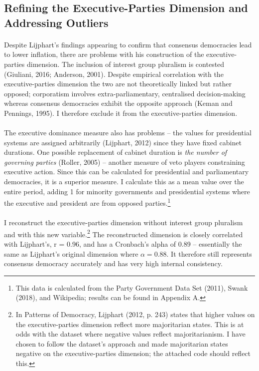 \documentclass[11pt, oneside]{article}   	%
\let\oldparagraph\paragraph
\renewcommand{\paragraph}[1]{\oldparagraph{#1}\mbox{}}
\begin{document}
\subsection{Refining the Executive-Parties Dimension and Addressing Outliers}

\paragraph{}
Despite Lijphart’s findings appearing to confirm that consensus democracies lead to lower inflation, there are problems with his construction of the executive-parties dimension. The inclusion of interest group pluralism is contested (Giuliani, 2016; Anderson, 2001). Despite empirical correlation with the executive-parties dimension the two are not theoretically linked but rather opposed; corporatism involves extra-parliamentary, centralised decision-making whereas consensus democracies exhibit the opposite approach (Keman and Pennings, 1995). I therefore exclude it from the executive-parties dimension.

\paragraph{}
The executive dominance measure also has problems – the values for presidential systems are assigned arbitrarily (Lijphart, 2012) since they have fixed cabinet durations. One possible replacement of cabinet duration is \textit{the number of governing parties} (Roller, 2005) – another measure of veto players constraining executive action. Since this can be calculated for presidential and parliamentary democracies, it is a superior measure. I calculate this as a mean value over the entire period, adding 1 for minority governments and presidential systems where the executive and president are from opposed parties.\footnote{  This data is calculated from the Party Government Data Set (2011), Swank (2018), and Wikipedia; results can be found in Appendix A.}

\paragraph{}
I reconstruct the executive-parties dimension without interest group pluralism and with this new variable.\footnote{  In Patterns of Democracy, Lijphart (2012, p. 243) states that higher values on the executive-parties dimension reflect more majoritarian states. This is at odds with the dataset where negative values reflect majoritarianism. I have chosen to follow the dataset’s approach and made majoritarian states negative on the executive-parties dimension; the attached code should reflect this.} The reconstructed dimension is closely correlated with Lijphart’s, r = 0.96, and has a Cronbach’s alpha of 0.89 – essentially the same as Lijphart’s original dimension where \begin{math}\alpha  = 0.88. \end{math} It therefore still represents consensus democracy accurately and has very high internal consistency.
\end{document}
